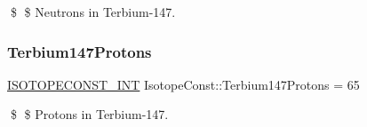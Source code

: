 \$ \$ Neutrons in Terbium-\/147. \mbox{\label{group___isotope_const-_terbium-_tb147_ga39ddd7b4bd8d6f66f9b6d948f838a55c}} 
\subsubsection{\texorpdfstring{Terbium147\+Protons}{Terbium147Protons}}
{\footnotesize\ttfamily \mbox{\hyperlink{group___isotope_const-_macros_ga5f18360b3e99483a35c32d789e62621c}{I\+S\+O\+T\+O\+P\+E\+C\+O\+N\+S\+T\+\_\+\+I\+NT}} Isotope\+Const\+::\+Terbium147\+Protons = 65}

\$ \$ Protons in Terbium-\/147. 